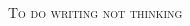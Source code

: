 \documentclass[a4paper,10pt,oneside]{article}
\begin{document}
  \begin{multicols}{4}
  \pagestyle{fancy}
  
  \fancyfoot{}
  \fancyhead[R]{\thepage}
  
  \renewcommand{\headrulewidth}{0.4pt}
  \renewcommand{\contentsname}{Contents}

   
  \scriptsize
  
  \clearpage
  \end{multicols}
  \newpage
  \begin{multicols}{4}
  \enlargethispage*{\baselineskip}
  \begin{center}
    \Huge\textsc{To do writing not thinking}
    \vspace{0.35cm}    
  \end{center}
  \tableofcontents
  \end{multicols}
  \clearpage
\end{document}
